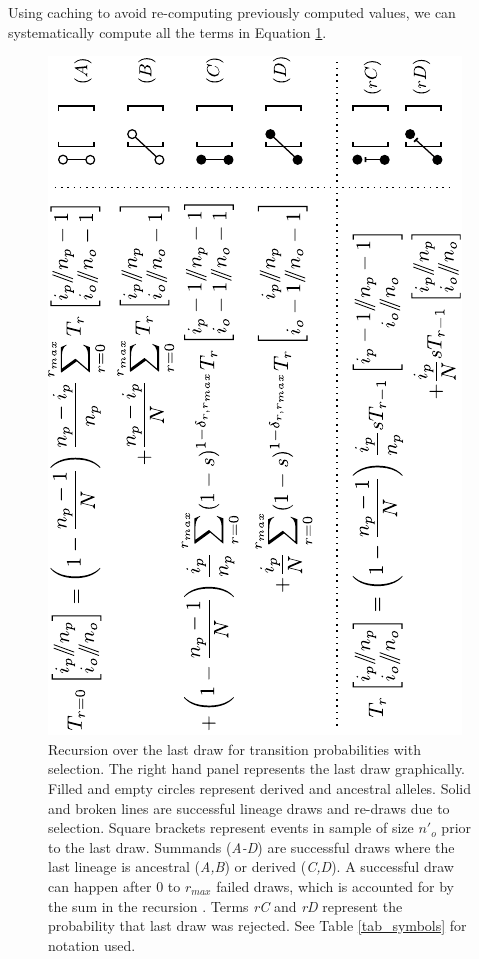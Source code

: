 \documentclass[9pt,twocolumn,twoside,lineno]{gsajnl}
\begin{document}
Using caching to avoid re-computing previously computed values, we can systematically compute all the terms in Equation
\ref{fig_rec_selection_dynamic_fail}.
\begin{figure}
  \centering
  \includegraphics[angle=-90,width=1.1\columnwidth]{fig/recurrence-selection-dynamic-failures-annotated.pdf}

  \caption{Recursion over the last draw for transition probabilities with selection. 
    The right hand panel represents the last draw graphically.
    Filled and empty circles represent derived and ancestral alleles. 
    Solid and broken lines are
    successful lineage draws and re-draws due to selection.
    Square brackets represent events in sample of size $n'_o$ prior to the last draw. Summands
    (\textit{A-D}) are successful draws where the last lineage is ancestral (\textit{A,B}) or
    derived (\textit{C,D}). A successful draw can happen after
    $0$ to $r_{max}$ failed draws, which is accounted for by the sum in the recursion . Terms \textit{rC} and \textit{rD}
    represent the probability that last draw was rejected. See Table \ref{tab_symbols} for notation used.
  }

  \label{fig_rec_selection_dynamic_fail}
\end{figure}
\end{document}
